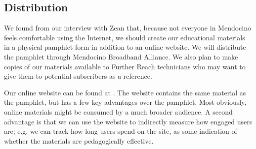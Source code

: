\subsection{Distribution}

We found from our interview with Zean that, because not everyone in Mendocino
feels comfortable using the Internet, we should create our educational
materials in a physical pamphlet form in addition to an online website. We
will distribute the pamphlet through Mendocino Broadband Alliance. We also
plan to make copies of our materials available to Further Reach technicians
who may want to give them to potential subscribers as a reference.

Our online website can be found at . The website contains the same
material as the pamphlet, but has a few key advantages over the pamphlet.
Most obviously, online materials might be consumed by a much broader audience. A second
advantage is that we can use the website to indirectly measure how engaged users
are; e.g. we can track how long users spend on the site, as some indication of
whether the materials are pedagogically effective.

